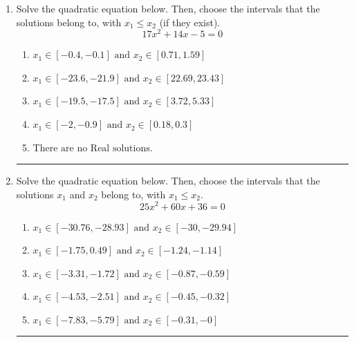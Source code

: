 \documentclass[14pt]{extbook}
\newcommand{\litem}[1]{\item#1\hspace*{-1cm}\rule{\textwidth}{0.4pt}}
\begin{document}
\begin{enumerate}
\litem{
Solve the quadratic equation below. Then, choose the intervals that the solutions belong to, with $x_1 \leq x_2$ (if they exist).\[ 17x^{2} +14 x -5 = 0 \]\begin{enumerate}[label=\Alph*.]
\item \( x_1 \in [-0.4, -0.1] \text{ and } x_2 \in [0.71, 1.59] \)
\item \( x_1 \in [-23.6, -21.9] \text{ and } x_2 \in [22.69, 23.43] \)
\item \( x_1 \in [-19.5, -17.5] \text{ and } x_2 \in [3.72, 5.33] \)
\item \( x_1 \in [-2, -0.9] \text{ and } x_2 \in [0.18, 0.3] \)
\item \( \text{There are no Real solutions.} \)

\end{enumerate} }
\litem{
Solve the quadratic equation below. Then, choose the intervals that the solutions $x_1$ and $x_2$ belong to, with $x_1 \leq x_2$.\[ 25x^{2} +60 x + 36 = 0 \]\begin{enumerate}[label=\Alph*.]
\item \( x_1 \in [-30.76, -28.93] \text{ and } x_2 \in [-30, -29.94] \)
\item \( x_1 \in [-1.75, 0.49] \text{ and } x_2 \in [-1.24, -1.14] \)
\item \( x_1 \in [-3.31, -1.72] \text{ and } x_2 \in [-0.87, -0.59] \)
\item \( x_1 \in [-4.53, -2.51] \text{ and } x_2 \in [-0.45, -0.32] \)
\item \( x_1 \in [-7.83, -5.79] \text{ and } x_2 \in [-0.31, -0] \)


\end{enumerate}}
\end{enumerate}
\end{document}
